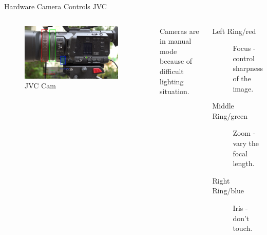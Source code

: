 \documentclass[aspectratio=169]{beamer}
\begin{document}
\begin{frame}{Hardware Camera Controls JVC}
	\begin{columns}[T,onlytextwidth]
	\begin{figure} 
		\centering
		\includegraphics[width=0.9\textwidth]{images/jvc_seitenansicht_objektiv.png}
		\caption{JVC Cam}
	\end{figure}
		Cameras are in manual mode because of difficult lighting situation.
		\begin{description}
			\item[Left Ring/red] Focus - control sharpness of the image.
			\item[Middle Ring/green] Zoom - vary the focal length.
			\item[Right Ring/blue] Iris - don't touch.
		\end{description}
	\end{columns}
\end{frame}
\end{document}
